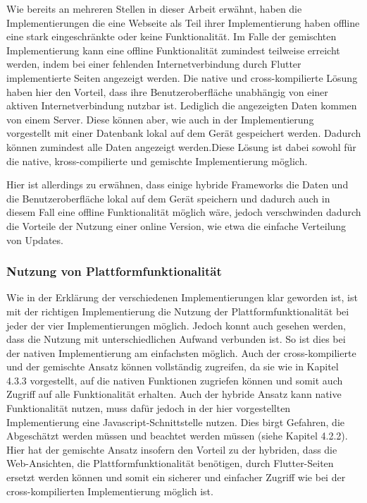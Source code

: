 Wie bereits an mehreren Stellen in dieser Arbeit erwähnt, haben die Implementierungen die eine Webseite als Teil ihrer Implementierung haben offline eine stark eingeschränkte oder keine Funktionalität. Im Falle der gemischten Implementierung kann eine offline Funktionalität zumindest teilweise erreicht werden, indem bei einer fehlenden Internetverbindung durch Flutter implementierte Seiten angezeigt werden. Die native und cross-kompilierte Lösung haben hier den Vorteil, dass ihre Benutzeroberfläche unabhängig von einer aktiven Internetverbindung nutzbar ist. Lediglich die angezeigten Daten kommen von einem Server. Diese können aber, wie auch in der Implementierung vorgestellt mit einer Datenbank lokal auf dem Gerät gespeichert werden. Dadurch können zumindest alle Daten angezeigt werden.Diese Lösung ist dabei sowohl für die native, kross-compilierte und gemischte Implementierung möglich. 

Hier ist allerdings zu erwähnen, dass einige hybride Frameworks die Daten und die Benutzeroberfläche lokal auf dem Gerät speichern und dadurch auch in diesem Fall eine offline Funktionalität möglich wäre, jedoch verschwinden dadurch die Vorteile der Nutzung einer online Version, wie etwa die einfache Verteilung von Updates.

\subsubsection{Nutzung von Plattformfunktionalität}
Wie in der Erklärung der verschiedenen Implementierungen klar geworden ist, ist mit der richtigen Implementierung die Nutzung der Plattformfunktionalität bei jeder der vier Implementierungen möglich. Jedoch konnt auch gesehen werden, dass die Nutzung mit unterschiedlichen Aufwand verbunden ist. So ist dies bei der nativen Implementierung am einfachsten möglich. Auch der cross-kompilierte und der gemischte Ansatz können vollständig zugreifen, da sie wie in Kapitel 4.3.3 vorgestellt, auf die nativen Funktionen zugriefen können und somit auch Zugriff auf alle Funktionalität erhalten. Auch der hybride Ansatz kann native Funktionalität nutzen, muss dafür jedoch in der hier vorgestellten Implementierung eine Javascript-Schnittstelle nutzen. Dies birgt Gefahren, die Abgeschätzt werden müssen und beachtet werden müssen (siehe Kapitel 4.2.2). Hier hat der gemischte Ansatz insofern den Vorteil zu der hybriden, dass die Web-Ansichten, die Plattformfunktionalität benötigen, durch Flutter-Seiten ersetzt werden können und somit ein sicherer und einfacher Zugriff wie bei der cross-kompilierten Implementierung möglich ist.
